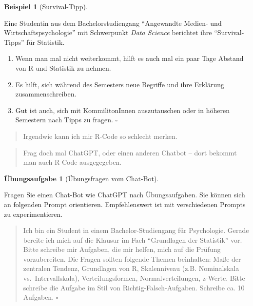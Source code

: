 \documentclass[
  letterpaper,
  twoside,
  open=any]{scrbook}
\providecommand{\tightlist}{%
  \setlength{\itemsep}{0pt}\setlength{\parskip}{0pt}}\usepackage{longtable,booktabs,array}
\theoremstyle{definition}
\newtheorem{exercise}{Übungsaufgabe}[chapter]
\theoremstyle{definition}
\newtheorem{example}{Beispiel}[chapter]
\theoremstyle{definition}
\theoremstyle{remark}
\begin{document}
\begin{example}[Survival-Tipp]\protect\hypertarget{exm-survival1}{}\label{exm-survival1}

Eine Studentin aus dem Bachelorstudiengang \enquote{Angewandte Medien-
und Wirtschaftspsychologie} mit Schwerpunkt \emph{Data Science}
berichtet ihre \enquote{Survival-Tipps} für Statistik.

\begin{enumerate}
\def\labelenumi{\arabic{enumi}.}
\tightlist
\item
  Wenn man mal nicht weiterkommt, hilft es auch mal ein paar Tage
  Abstand von R und Statistik zu nehmen.
\item
  Es hilft, sich während des Semesters neue Begriffe und ihre Erklärung
  zusammenschreiben.
\item
  Gut ist auch, sich mit KommilitonInnen auszutauschen oder in höheren
  Semestern nach Tipps zu fragen. \(\square\)
\end{enumerate}

\end{example}

\begin{quote}
{} Irgendwie kann ich mir R-Code so schlecht merken.
\end{quote}

\begin{quote}
{} Frag doch mal ChatGPT, oder einen anderen Chatbot --
dort bekommt man auch R-Code ausgegegeben.
\end{quote}

\begin{exercise}[Übungsfragen vom
Chat-Bot]\protect\hypertarget{exr-chatgpt}{}\label{exr-chatgpt}

Fragen Sie einen Chat-Bot wie ChatGPT nach Übungsaufgaben. Sie können
sich an folgenden Prompt orientieren. Empfehlenswert ist mit
verschiedenen Prompts zu experimentieren.

\begin{quote}
{} Ich bin ein Student in einem Bachelor-Studiengang für
Psychologie. Gerade bereite ich mich auf die Klausur im Fach
\enquote{Grundlagen der Statistik} vor. Bitte schreibe mir Aufgaben, die
mir helfen, mich auf die Prüfung vorzubereiten. Die Fragen sollten
folgende Themen beinhalten: Maße der zentralen Tendenz, Grundlagen von
R, Skalenniveau (z.B. Nominalskala vs.~Intervallskala),
Verteilungsformen, Normalverteilungen, z-Werte. Bitte schreibe die
Aufgabe im Stil von Richtig-Falsch-Aufgaben. Schreibe ca. 10 Aufgaben.
\(\square\)
\end{quote}

\end{exercise}
\end{document}
